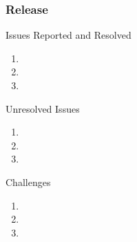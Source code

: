 \begin{frame}
	\centering
	\frametitle{Release}

	\begin{block}{Issues Reported and Resolved}				
		\begin{enumerate}
			\item 
			\item 
			\item 		
		\end{enumerate}		
	\end{block}	
	
	\pause
	
	\begin{block}{Unresolved Issues}				
		\begin{enumerate}
			\item 
			\item 
			\item 		
		\end{enumerate}		
	\end{block}	

	\pause
	
	\begin{block}{Challenges}				
		\begin{enumerate}
			\item 
			\item 
			\item 		
		\end{enumerate}		
	\end{block}
	
\end{frame}
